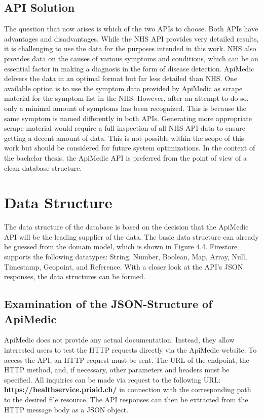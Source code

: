 \subsection{API Solution}
The question that now arises is which of the two APIs to choose. Both APIs have advantages and disadvantages. While the NHS API provides very detailed results, it is challenging to use the data for the purposes intended in this work. NHS also provides data on the causes of various symptoms and conditions, which can be an essential factor in making a diagnosis in the form of disease detection. ApiMedic delivers the data in an optimal format but far less detailed than NHS. One available option is to use the symptom data provided by ApiMedic as scrape material for the symptom list in the NHS. However, after an attempt to do so, only a minimal amount of symptoms has been recognized. This is because the same symptom is named differently in both APIs. Generating more appropriate scrape material would require a full inspection of all NHS API data to ensure getting a decent amount of data. This is not possible within the scope of this work but should be considered for future system optimizations. In the context of the bachelor thesis, the ApiMedic API is preferred from the point of view of a clean database structure.

\section{Data Structure}
The data structure of the database is based on the decision that the ApiMedic API will be the leading supplier of the data. The basic data structure can already be guessed from the domain model, which is shown in Figure 4.4. Firestore supports the following datatypes: String, Number, Boolean, Map, Array, Null, Timestamp, Geopoint, and Reference. With a closer look at the API's JSON responses, the data structures can be formed.

\subsection{Examination of the JSON-Structure of ApiMedic}
ApiMedic does not provide any actual documentation. Instead, they allow interested users to test the HTTP requests directly via the ApiMedic website. To access the API, an HTTP request must be sent. The URL of the endpoint, the HTTP method, and, if necessary, other parameters and headers must be specified. All inquiries can be made via request to the following URL: \textbf{https://healthservice.priaid.ch/} in connection with the corresponding path to the desired file resource. The API responses can then be extracted from the HTTP message body as a JSON object.

